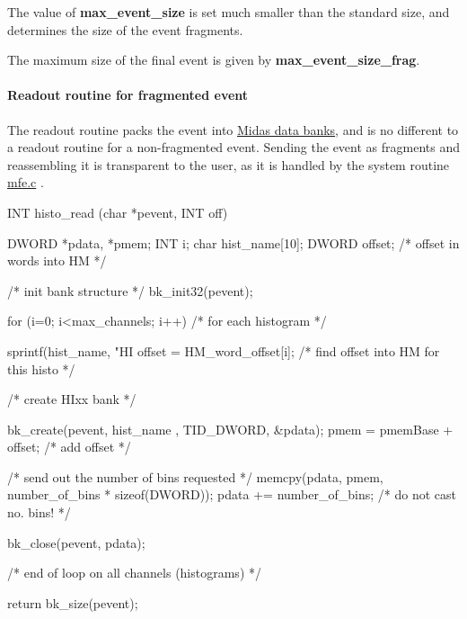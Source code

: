 \begin{DoxyItemize}
\item The value of {\bfseries max\_\-event\_\-size} is set much smaller than the standard size, and determines the size of the event fragments.
\item The maximum size of the final event is given by {\bfseries max\_\-event\_\-size\_\-frag}.
\end{DoxyItemize}\hypertarget{FE_eq_event_routines_FE_frag_readout_code}{}\paragraph{Readout routine for fragmented event}\label{FE_eq_event_routines_FE_frag_readout_code}
The readout routine packs the event into \hyperlink{FE_bank_construction}{Midas data banks}, and is no different to a readout routine for a non-\/fragmented event. Sending the event as fragments and reassembling it is transparent to the user, as it is handled by the system routine \hyperlink{mfe_8c}{mfe.c} .


\begin{DoxyCode}
INT histo_read (char *pevent, INT off)
{
  DWORD *pdata, *pmem;
  INT i;
  char hist_name[10];
  DWORD offset; /* offset in words into HM */

  /* init bank structure */
  bk_init32(pevent);

  for (i=0; i<max_channels; i++)   /* for each histogram */

  {
    sprintf(hist_name, "HI%
    offset = HM_word_offset[i]; /* find offset into HM for this histo */

    /* create HIxx bank */

      bk_create(pevent, hist_name , TID_DWORD, &pdata);
      pmem = pmemBase + offset; /* add offset */



      /* send out the number of bins requested */
      memcpy(pdata, pmem, number_of_bins * sizeof(DWORD));
      pdata +=  number_of_bins; /* do not cast no. bins! */
     
      bk_close(pevent, pdata);
    
  } /* end of loop on all channels (histograms) */

  return bk_size(pevent);
}
\end{DoxyCode}


